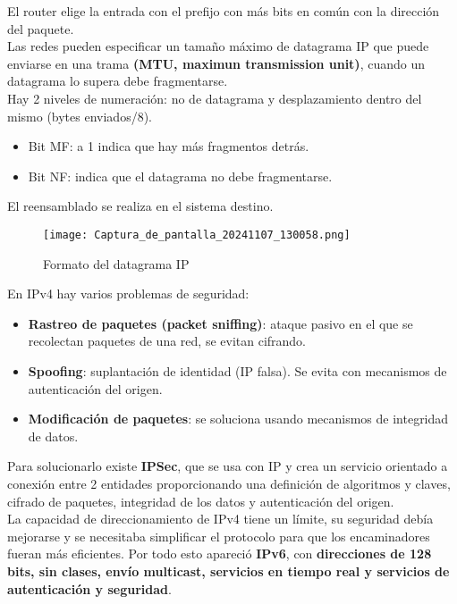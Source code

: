 \documentclass{article}
\begin{document}
El router elige la entrada con el prefijo con más bits en común con la dirección del paquete. \\
Las redes pueden especificar un tamaño máximo de datagrama IP que puede enviarse en una trama \textbf{(MTU, maximun transmission unit)}, cuando un datagrama lo supera debe fragmentarse. \\
Hay 2 niveles de numeración: no de datagrama y desplazamiento dentro del mismo (bytes enviados/8).
\begin{itemize}
    \item Bit MF: a 1 indica que hay más fragmentos detrás.
    \item Bit NF: indica que el datagrama no debe fragmentarse.
\end{itemize}
El reensamblado se realiza en el sistema destino. \\
\begin{figure}[h]
    \centering
    \texttt{[image: Captura\_de\_pantalla\_20241107\_130058.png]}
    \caption{Formato del datagrama IP}
    \label{fig:etiqueta}
\end{figure}

En IPv4 hay varios problemas de seguridad: 
\begin{itemize}
    \item \textbf{Rastreo de paquetes (packet sniffing)}: ataque pasivo en el que se recolectan paquetes de una red, se evitan cifrando. 
    \item \textbf{Spoofing}: suplantación de identidad (IP falsa). Se evita con mecanismos de autenticación del origen. 
    \item \textbf{Modificación de paquetes}: se soluciona usando mecanismos de integridad de datos.
\end{itemize}

Para solucionarlo existe \textbf{IPSec}, que se usa con IP y crea un servicio orientado a conexión entre 2 entidades proporcionando una definición de algoritmos y claves, cifrado de paquetes, integridad de los datos y autenticación del origen. \\

La capacidad de direccionamiento de IPv4 tiene un límite, su seguridad debía mejorarse y se
necesitaba simplificar el protocolo para que los encaminadores fueran más eficientes. Por todo esto
apareció \textbf{IPv6}, con \textbf{direcciones de 128 bits, sin clases, envío multicast, servicios en tiempo real y servicios de autenticación y seguridad}. \\
\end{document}
